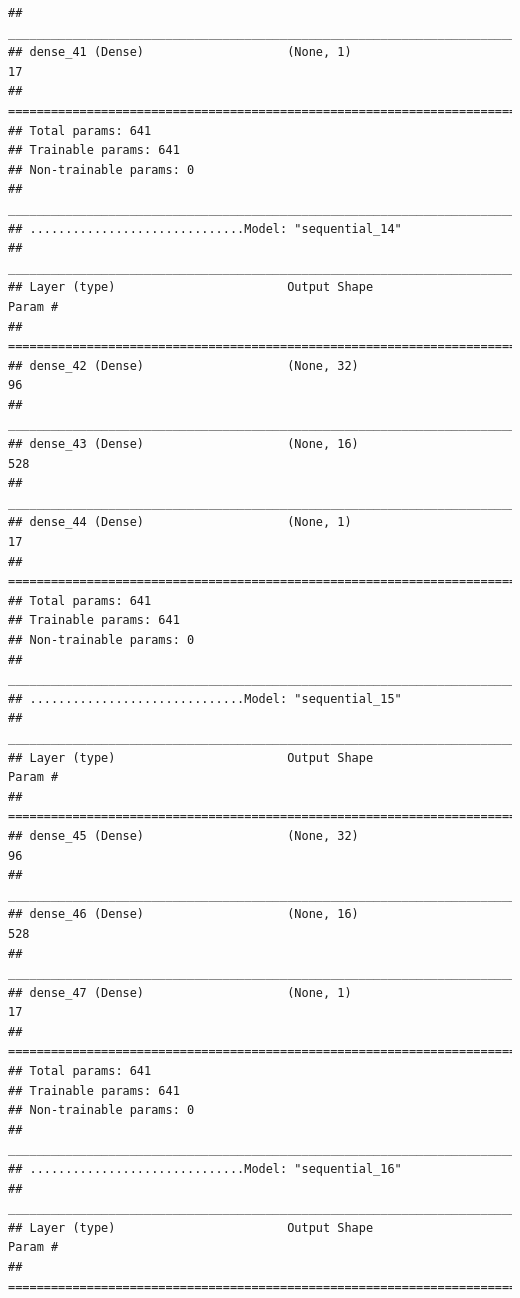 \documentclass[
]{article}
\begin{document}
\begin{verbatim}
## ________________________________________________________________________________
## dense_41 (Dense)                    (None, 1)                       17          
## ================================================================================
## Total params: 641
## Trainable params: 641
## Non-trainable params: 0
## ________________________________________________________________________________
## ..............................Model: "sequential_14"
## ________________________________________________________________________________
## Layer (type)                        Output Shape                    Param #     
## ================================================================================
## dense_42 (Dense)                    (None, 32)                      96          
## ________________________________________________________________________________
## dense_43 (Dense)                    (None, 16)                      528         
## ________________________________________________________________________________
## dense_44 (Dense)                    (None, 1)                       17          
## ================================================================================
## Total params: 641
## Trainable params: 641
## Non-trainable params: 0
## ________________________________________________________________________________
## ..............................Model: "sequential_15"
## ________________________________________________________________________________
## Layer (type)                        Output Shape                    Param #     
## ================================================================================
## dense_45 (Dense)                    (None, 32)                      96          
## ________________________________________________________________________________
## dense_46 (Dense)                    (None, 16)                      528         
## ________________________________________________________________________________
## dense_47 (Dense)                    (None, 1)                       17          
## ================================================================================
## Total params: 641
## Trainable params: 641
## Non-trainable params: 0
## ________________________________________________________________________________
## ..............................Model: "sequential_16"
## ________________________________________________________________________________
## Layer (type)                        Output Shape                    Param #     
## ================================================================================

\end{verbatim}
\end{document}
